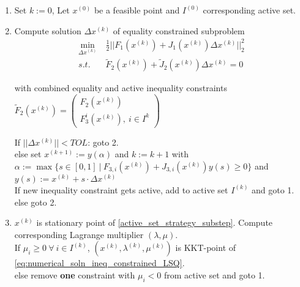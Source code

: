 \documentclass{scrartcl}[12pt, halfparskip]
\numberwithin{equation}{section}
\numberwithin{figure}{section}
\numberwithin{table}{section}
\begin{document}
\begin{enumerate}
	\item Set $k := 0$, Let $x^{(0)}$ be a feasible point and $I^{(0)}$ corresponding active set.
	\item Compute solution $\Delta x^{(k)}$ of equality constrained subproblem
	\begin{align}
	\min_{\Delta x^{(k)}} & \ \frac{1}{2} || F_1(x^{(k)}) + J_1(x^{(k)}) \Delta x^{(k)} ||_2^2 \nonumber \\
	s.t. & \ \tilde{F}_2(x^{(k)}) + \tilde{J}_2(x^{(k)}) \Delta x^{(k)} = 0
	\label{active_set_strategy_substep}
	\end{align}
	
	with combined equality and active inequality constraints $\tilde{F}_2(x^{(k)}) = 
	\begin{pmatrix} 
	F_2(x^{(k)}) \\  
	F_3^i(x^{(k)}), \ i \in I^k
	\end{pmatrix}$
	
	If $||\Delta x^{(k)}|| < TOL$: goto 2. \\
	else set $x^{(k+1)} := y(\alpha)$ and $k := k+1$ with \\
	$\alpha := \max\{ s \in [0,1] \ | \ F_{3,i}(x^{(k)}) + J_{3,i}(x^{(k)}) y(s) \ge 0 \}$ and \\
	$y(s) := x^{(k)} + s \cdot \Delta x^{(k)}$ \\
	
	If new inequality constraint gets active, add to active set $I^{(k)}$ and goto 1. \\
	else goto 2.
	
	\item $x^{(k)}$ is stationary point of \cref{active_set_strategy_substep}. Compute corresponding Lagrange multiplier $(\lambda, \mu)$. \\
	If $\mu_i \ge 0 \ \forall \ i \in I^{(k)}$, $(x^{(k)},\lambda^{(k)},\mu^{(k)})$ is KKT-point of \cref{eq:numerical_soln_ineq_constrained_LSQ}. \\
	else remove \textbf{one} constraint with $\mu_i < 0$ from active set and goto 1.
	
\end{enumerate}
\end{document}
